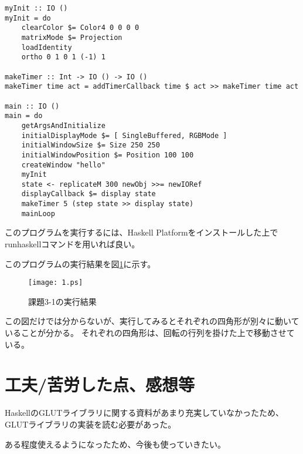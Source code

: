\documentclass[titlepage]{jsarticle}
\begin{document}
\begin{lstlisting}[style=program, label=list:impl1, caption=課題3のソースコード]
myInit :: IO ()
myInit = do
    clearColor $= Color4 0 0 0 0
    matrixMode $= Projection
    loadIdentity
    ortho 0 1 0 1 (-1) 1

makeTimer :: Int -> IO () -> IO ()
makeTimer time act = addTimerCallback time $ act >> makeTimer time act

main :: IO ()
main = do
    getArgsAndInitialize
    initialDisplayMode $= [ SingleBuffered, RGBMode ]
    initialWindowSize $= Size 250 250
    initialWindowPosition $= Position 100 100
    createWindow "hello"
    myInit
    state <- replicateM 300 newObj >>= newIORef
    displayCallback $= display state
    makeTimer 5 (step state >> display state)
    mainLoop
\end{lstlisting}

このプログラムを実行するには、Haskell Platformをインストールした上でrunhaskellコマンドを用いれば良い。

このプログラムの実行結果を図\ref{fig:output1}に示す。

\begin{figure}[htbp]
\begin{center}
\texttt{[image: 1.ps]}
\end{center}
\caption{課題3-1の実行結果}
\label{fig:output1}
\end{figure}

この図だけでは分からないが、実行してみるとそれぞれの四角形が別々に動いていることが分かる。
それぞれの四角形は、回転の行列を掛けた上で移動させている。

\section{工夫/苦労した点、感想等}

HaskellのGLUTライブラリに関する資料があまり充実していなかったため、GLUTライブラリの実装を読む必要があった。

ある程度使えるようになったため、今後も使っていきたい。
\end{document}
